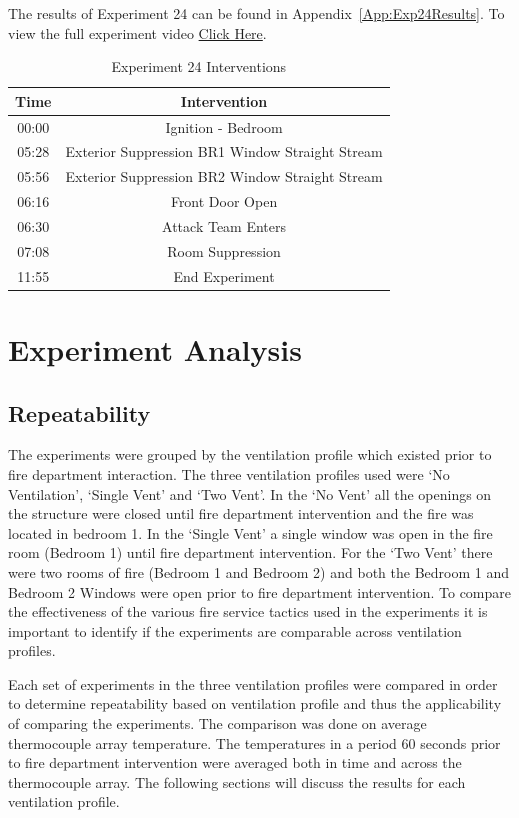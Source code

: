 \documentclass[12pt,oneside]{book}
\begin{document}
The results of Experiment 24 can be found in Appendix~\ref{App:Exp24Results}. To view the full experiment video \href{https://youtu.be/gl8rc1Nsl1k}{Click Here}.

\begin{table}[H]
	\centering
	\caption{Experiment 24 Interventions}
	\begin{tabular}{|c|c|} 
		\hline
		Time & Intervention \\ \hline \hline
		00:00 & Ignition - Bedroom \\ \hline
		05:28 & Exterior Suppression BR1 Window Straight Stream \\ \hline
		05:56 & Exterior Suppression BR2 Window Straight Stream \\ \hline		
		06:16 & Front Door Open \\ \hline
		06:30 & Attack Team Enters\\ \hline
		07:08 & Room Suppression \\ \hline 
		11:55 & End Experiment\\ \hline
	\end{tabular}
	\label{Table:Exp24Interventions}
\end{table}

\clearpage

\chapter{Experiment Analysis}

\section{Repeatability}
The experiments were grouped by the ventilation profile which existed prior to fire department interaction. The three ventilation profiles used were `No Ventilation', `Single Vent' and `Two Vent'. In the `No Vent' all the openings on the structure were closed until fire department intervention and the fire was located in bedroom 1. In the `Single Vent' a single window was open in the fire room (Bedroom 1) until fire department intervention. For the `Two Vent' there were two rooms of fire (Bedroom 1 and Bedroom 2) and both the Bedroom 1 and Bedroom 2 Windows were open prior to fire department intervention. To compare the effectiveness of the various fire service tactics used in the experiments it is important to identify if the experiments are comparable across ventilation profiles. 

Each set of experiments in the three ventilation profiles were compared in order to determine repeatability based on ventilation profile and thus the applicability of comparing the experiments. The comparison was done on average thermocouple array temperature. The temperatures in a period 60 seconds prior to fire department intervention were averaged both in time and across the thermocouple array. The following sections will discuss the results for each ventilation profile. 
\end{document}
